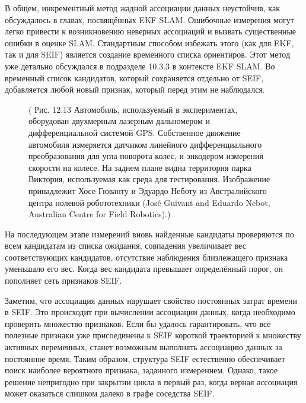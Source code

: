 \documentclass[10pt,a4paper]{article}
\begin{document}
В общем, инкрементный метод жадной ассоциации данных неустойчив, как обсуждалось в главах, посвящённых EKF SLAM. Ошибочные измерения могут легко привести  к возникновению неверных ассоциаций и вызвать существенные ошибки в оценке SLAM. Стандартным способом избежать этого (как для EKF, так и для SEIF) является создание временного списка ориентиров. Этот метод уже детально обсуждался в подразделе 10.3.3 в контексте EKF SLAM. Во временный список кандидатов, который сохраняется отдельно от SEIF, добавляется любой новый признак, который перед этим не наблюдался. 
\begin{figure}[H]
	\caption{ ( Рис. 12.13 Автомобиль, используемый в экспериментах, оборудован двухмерным лазерным дальномером и дифференциальной системой GPS. Собственное движение автомобиля измеряется датчиком линейного дифференциального преобразования для угла поворота колес, и энкодером измерения скорости на колесе. На заднем плане видна территория парка Виктория, используемая как среда для тестирования. Изображение принадлежит Хосе Гюванту и Эдуардо Неботу из Австралийского центра полевой робототехники (José Guivant and Eduardo Nebot, Australian Centre for Field Robotics).) }
	\label{fig:1213orig}
\end{figure}
На последующем этапе измерений вновь найденные кандидаты проверяются по всем кандидатам из списка ожидания, совпадения увеличивает вес соответствующих кандидатов, отсутствие наблюдения близлежащего признака уменьшало его вес. Когда вес кандидата превышает определённый порог, он пополняет сеть признаков SEIF.

Заметим, что ассоциация данных нарушает свойство постоянных затрат времени в SEIF. Это происходит при вычислении ассоциации данных, когда необходимо проверить множество признаков. Если бы удалось гарантировать, что все полезные признаки уже присоединены к SEIF короткой траекторией к множеству активных переменных, станет возможным выполнять ассоциацию данных за постоянное время. Таким образом, структура SEIF естественно обеспечивает поиск наиболее вероятного признака, заданного измерением. Однако, такое решение непригодно при закрытии цикла в первый раз, когда верная ассоциация может оказаться слишком далеко в графе соседства SEIF.
\end{document}
